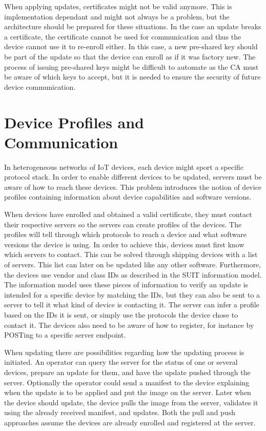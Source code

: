 \documentclass[0-thesis.tex]{subfiles}
\begin{document}
When applying updates, certificates might not be valid anymore. This is implementation
dependant and might not always be a problem, but the architecture should be prepared for
these situations. In the case an update breaks a certificate, the certificate cannot be
used for communication and thus the device cannot use it to re-enroll either. In this
case, a new pre-shared key should be part of the update so that the device can enroll as
if it was factory new. The process of issuing pre-shared keys might be difficult to
automate as the CA must be aware of which keys to accept, but it is needed to ensure the
security of future device communication.

\section{Device Profiles and Communication}
\label{sec:communication}
In heterogeneous networks of IoT devices, each device might sport a specific protocol
stack. In order to enable different devices to be updated, servers must be aware of how to
reach these devices. This problem introduces the notion of device profiles containing
information about device capabilities and software versions. 

When devices have enrolled and obtained a valid certificate, they must contact their
respective servers so the servers can create profiles of the devices. The profiles will
tell through which protocols to reach a device and what software versions the device is
using. In order to achieve this, devices must first know which servers to contact. This
can be solved through shipping devices with a list of servers. This list can later on be
updated like any other software. Furthermore, the devices use vendor and class IDs as
described in the SUIT information model. The information model uses these pieces of
information to verify an update is intended for a specific device by matching the IDs, but
they can also be sent to a server to tell it what kind of device is contacting it. The
server can infer a profile based on the IDs it is sent, or simply use the protocols the
device chose to contact it. The devices also need to be aware of how to register, for
instance by POSTing to a specific server endpoint. 

When updating there are possibilities regarding how the updating process is initiated. An
operator can query the server for the status of one or several devices, prepare an update
for them, and have the update pushed through the server. Optionally the operator could
send a manifest to the device explaining when the update is to be applied and put the
image on the server. Later when the device should update, the device pulls the image from
the server, validates it using the already received manifest, and updates. Both the pull
and push approaches assume the devices are already enrolled and registered at the server.
\end{document}
